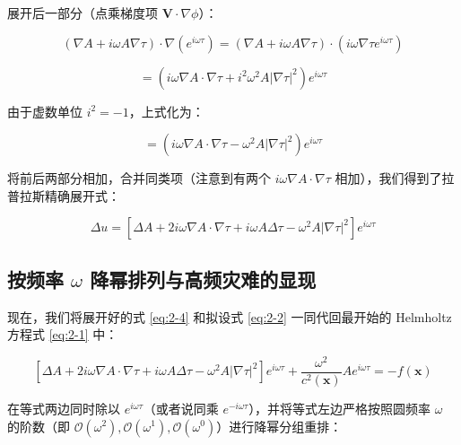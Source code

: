 \documentclass[12pt]{article}
\begin{document}
{展开后一部分（点乘梯度项 $\mathbf{V} \cdot \nabla \phi$）：

\begin{equation}
(\nabla A + i \omega A \nabla \tau) \cdot \nabla(e^{i \omega \tau})
= (\nabla A + i \omega A \nabla \tau) \cdot \left( i \omega \nabla \tau e^{i \omega \tau} \right)
\label{eq:2-v-dot-gradphi-1}
\end{equation}

\begin{equation}
= \left( i \omega \nabla A \cdot \nabla \tau + i^2 \omega^2 A |\nabla \tau|^2 \right) e^{i \omega \tau}
\label{eq:2-v-dot-gradphi-2}
\end{equation}

由于虚数单位 $i^2 = -1$，上式化为：

\begin{equation}
= \left( i \omega \nabla A \cdot \nabla \tau - \omega^2 A |\nabla \tau|^2 \right) e^{i \omega \tau}
\label{eq:2-v-dot-gradphi-3}
\end{equation}

将前后两部分相加，合并同类项（注意到有两个 $i \omega \nabla A \cdot \nabla \tau$ 相加），我们得到了拉普拉斯精确展开式：

\begin{equation}
\Delta u = \left[ \Delta A + 2 i \omega \nabla A \cdot \nabla \tau + i \omega A \Delta \tau - \omega^2 A |\nabla \tau|^2 \right] e^{i \omega \tau}
\label{eq:2-4}
\end{equation}

\subsection{按频率 $\omega$ 降幂排列与高频灾难的显现}

现在，我们将展开好的式 \eqref{eq:2-4} 和拟设式 \eqref{eq:2-2} 一同代回最开始的 Helmholtz 方程式 \eqref{eq:2-1} 中：

\begin{equation}
\left[ \Delta A + 2 i \omega \nabla A \cdot \nabla \tau + i \omega A \Delta \tau - \omega^2 A |\nabla \tau|^2 \right] e^{i \omega \tau} + \frac{\omega^2}{c^2(\mathbf{x})} A e^{i \omega \tau} = -f(\mathbf{x})
\label{eq:2-substitute}
\end{equation}

在等式两边同时除以 $e^{i \omega \tau}$（或者说同乘 $e^{-i \omega \tau}$），并将等式左边严格按照圆频率 $\omega$ 的阶数（即 $\mathcal{O}(\omega^2), \mathcal{O}(\omega^1), \mathcal{O}(\omega^0)$）进行降幂分组重排：

}
\end{document}
